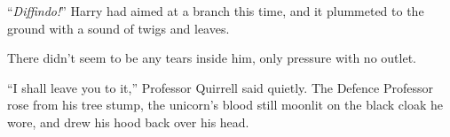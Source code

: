 “\emph{Diffindo!}” Harry had aimed at a branch this time, and it plummeted to the ground with a sound of twigs and leaves.

There didn’t seem to be any tears inside him, only pressure with no outlet.

“I shall leave you to it,” Professor Quirrell said quietly. The Defence Professor rose from his tree stump, the unicorn’s blood still moonlit on the black cloak he wore, and drew his hood back over his head.


